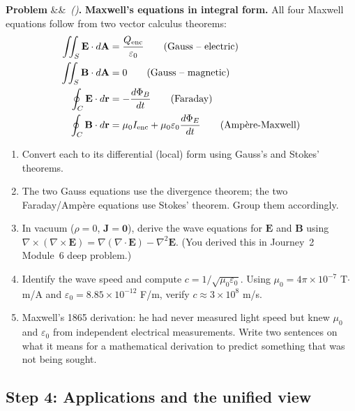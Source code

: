 \documentclass[12pt,a4paper]{article}
\newcounter{problem}
\newenvironment{problem}[1][]{\refstepcounter{problem}\par\vspace{6pt}\noindent\textbf{\color{MidBlue}Problem \theproblem}\ifx&#1&\else\ \textit{(#1)}\fi\textbf{.}\enskip}{\par\vspace{4pt}}
\begin{document}
\begin{problem}
\label{prob:maxwell_integral}
\textbf{Maxwell's equations in integral form.} All four Maxwell equations follow from two vector calculus theorems:
\begin{align*}
  \iint_S\mathbf{E}\cdot d\mathbf{A} &= \frac{Q_{\text{enc}}}{\varepsilon_0} \tag{Gauss -- electric}\\
  \iint_S\mathbf{B}\cdot d\mathbf{A} &= 0 \tag{Gauss -- magnetic}\\
  \oint_C\mathbf{E}\cdot d\mathbf{r} &= -\frac{d\Phi_B}{dt} \tag{Faraday}\\
  \oint_C\mathbf{B}\cdot d\mathbf{r} &= \mu_0 I_{\text{enc}} + \mu_0\varepsilon_0\frac{d\Phi_E}{dt} \tag{Amp\`{e}re-Maxwell}
\end{align*}
\begin{enumerate}[label=(\alph*),topsep=2pt]
  \item Convert each to its differential (local) form using Gauss's and Stokes' theorems.
  \item The two Gauss equations use the divergence theorem; the two Faraday/Amp\`{e}re equations use Stokes' theorem. Group them accordingly.
  \item In vacuum ($\rho=0$, $\mathbf{J}=\mathbf{0}$), derive the wave equations for $\mathbf{E}$ and $\mathbf{B}$ using $\nabla\times(\nabla\times\mathbf{E}) = \nabla(\nabla\cdot\mathbf{E}) - \nabla^2\mathbf{E}$. (You derived this in Journey~2 Module~6 deep problem.)
  \item Identify the wave speed and compute $c = 1/\sqrt{\mu_0\varepsilon_0}$. Using $\mu_0 = 4\pi\times10^{-7}$ T$\cdot$m/A and $\varepsilon_0 = 8.85\times10^{-12}$ F/m, verify $c \approx 3\times10^8$ m/s.
  \item Maxwell's 1865 derivation: he had never measured light speed but knew $\mu_0$ and $\varepsilon_0$ from independent electrical measurements. Write two sentences on what it means for a mathematical derivation to predict something that was not being sought.
\end{enumerate}
\end{problem}

\subsection{Step 4: Applications and the unified view}
\end{document}
